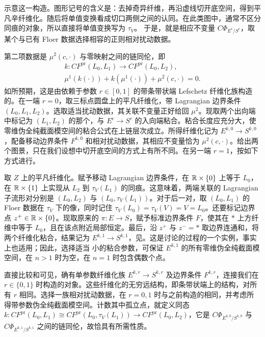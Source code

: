 示意这一构造。图形记号的含义是：去掉奇异纤维，再沿虚线切开底空间，得到平凡辛纤维化。随后将单值变换看成切口两侧之间的认同。在此类图中，通常不区分同痕的对象，所以直接将单值变换写为 $\tau_V$。
于是，就是相应不变量 $C\Phi_{E^c/S^c}$，取某个与已有 Floer 数据选择相容的正则相对扰动数据。

第二项数据是 $\mu^2(c,\cdot)$ 与零映射之间的链同伦，即
\begin{equation}\label{eq:17.13}
\boxed{\begin{gathered}
k:CF^{\mathrm{pr}}(L_0,L_1)\longrightarrow CF^{\mathrm{pr}}(L_0,L_2),\\
\mu^1(k(\cdot))+k(\mu^1(\cdot))+\mu^2(c,\cdot)=0.
\end{gathered}}
\end{equation}
如所预期，这是由依赖于参数 $r\in[0,1]$ 的带条带状端 Lefschetz 纤维化族构造的。在一端 $r=0$，取三标点圆盘上的平凡纤维化，带 Lagrangian 边界条件 $(L_0,L_1,L_2)$。选取适当扰动数据，其关联不变量正好给回 $\mu^2$。现取两个出向端中标记为 $(L_1,L_2)$ 的那个，与 $E^c\to S^c$ 的入向端粘合。粘合长度应充分大，使零维伪全纯截面模空间的粘合公式在上链层次成立。所得纤维化记为 $E^{k,0}\to S^{k,0}$，配备移动边界条件 $F^{k,0}$
和相对扰动数据，其相应不变量恰为 $\mu^2(c,\cdot)$。给出两个图景，只在我们设想中切开底空间的方式上有所不同。在另一端 $r=1$，按如下方式进行。

取 $Z$ 上的平凡纤维化。赋予移动 Lagrangian 边界条件，在 $\mathbb R\times\{0\}$ 上等于 $L_0$，在 $\mathbb R\times\{1\}$ 上实现从 $L_2$ 到 $\tau_V(L_1)$ 的同痕。这意味着，两端关联的 Lagrangian 子流形对分别是 $(L_0,L_2)$ 与 $(L_0,\tau_V(L_1))$。对于后一对，取 $(L_0,L_1)$ 的 Floer 数据在 $\tau_V$ 下的像，同时记住 $\tau_V(L_0)=\tau_V(V)=V=L_0$。还要标记边界点 $z^+\in\mathbb R\times\{0\}$。现取原来的 $\pi:E\to S$，赋予标准边界条件 $F$，使其在 $*$ 上方纤维中等于 $L_0$，且在该点附近局部恒定。最后，沿 $z^+$ 与 $z^-=*$ 取边界连通和，将两个纤维化粘合，结果记为 $E^{k,1}\to S^{k,1}$，见。这是讨论的过程的一个实例，事实上也适用；因此，选择适当
小的粘合参数，可保证 $E^{k,1}$ 的所有零维伪全纯截面模空间，在 $n>1$ 时为空，在 $n=1$ 时包含偶数个点。

直接比较和可见，确有单参数纤维化族 $E^{k,r}\to S^{k,r}$ 及边界条件 $F^{k,r}$，连接我们在 $r\in\{0,1\}$ 时构造的对象。这些纤维化的无穷远结构，即条带状端上的结构，对所有 $r$ 相同。选择一族相对扰动数据，在 $r=0,1$ 时与之前构造的相同，并考虑所得带参数伪全纯截面模空间。计数其中孤立点，就定义同态 $k:CF^{\mathrm{pr}}(L_0,L_1)\cong CF^{\mathrm{pr}}(L_0,\tau_V(L_1))\to CF^{\mathrm{pr}}(L_0,L_2)$，它是 $C\Phi_{E^{k,0}/S^{k,0}}$ 与 $C\Phi_{E^{k,1}/S^{k,1}}$ 之间的链同伦，故恰具有所需性质。


